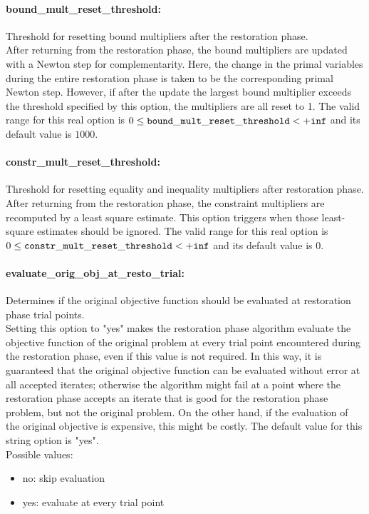 \paragraph{bound\_mult\_reset\_threshold:}\label{opt:bound_mult_reset_threshold} Threshold for resetting bound multipliers after the restoration phase. \\
 After returning from the restoration phase, the bound multipliers are updated with a Newton step for complementarity.  Here, the change in the primal variables during the entire restoration phase is taken to be the corresponding primal Newton step. However, if after the update the largest bound multiplier exceeds the threshold specified by this option, the multipliers are all reset to 1. The valid range for this real option is 
$0 \le {\tt bound\_mult\_reset\_threshold } <  {\tt +inf}$
and its default value is $1000$.


\paragraph{constr\_mult\_reset\_threshold:}\label{opt:constr_mult_reset_threshold} Threshold for resetting equality and inequality multipliers after restoration phase. \\
 After returning from the restoration phase, the constraint multipliers are recomputed by a least square estimate.  This option triggers when those least-square estimates should be ignored. The valid range for this real option is 
$0 \le {\tt constr\_mult\_reset\_threshold } <  {\tt +inf}$
and its default value is $0$.


\paragraph{evaluate\_orig\_obj\_at\_resto\_trial:}\label{opt:evaluate_orig_obj_at_resto_trial} Determines if the original objective function should be evaluated at restoration phase trial points. \\
 Setting this option to "yes" makes the restoration phase algorithm evaluate the objective function of the original problem at every trial point encountered during the restoration phase, even if this value is not required.  In this way, it is guaranteed that the original objective function can be evaluated without error at all accepted iterates; otherwise the algorithm might fail at a point where the restoration phase accepts an iterate that is good for the restoration phase problem, but not the original problem.  On the other hand, if the evaluation of the original objective is expensive, this might be costly. The default value for this string option is "yes".
\\ 
Possible values:
\begin{itemize}
   \item no: skip evaluation
   \item yes: evaluate at every trial point
\end{itemize}

